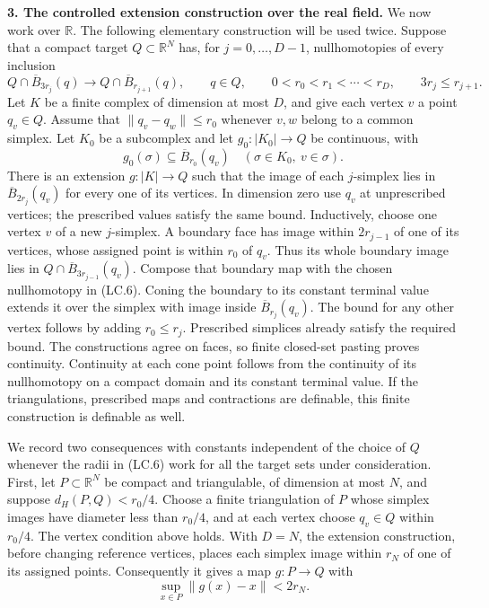 \textbf{3. The controlled extension construction over the real field.}
We now work over $\mathbb R$. The following elementary construction will
be used twice. Suppose that a compact target $Q\subset\mathbb R^N$
has, for $j=0,\ldots,D-1$, nullhomotopies of every inclusion
\[
 Q\cap\overline B_{3r_j}(q)
       \longrightarrow Q\cap\overline B_{r_{j+1}}(q),
 \qquad q\in Q,\qquad
 0<r_0<r_1<\cdots<r_D,\qquad 3r_j\le r_{j+1}.
 \tag{LC.6}
\]
Let $K$ be a finite complex of dimension at most $D$, and give each
vertex $v$ a point $q_v\in Q$. Assume that $\|q_v-q_w\|\le r_0$
whenever $v,w$ belong to a common simplex. Let $K_0$ be a subcomplex
and let $g_0:|K_0|\to Q$ be continuous, with
\[
 g_0(\sigma)\subseteq\overline B_{r_0}(q_v)
 \quad(\sigma\in K_0,\ v\in\sigma).
 \tag{LC.7}
\]
There is an extension $g:|K|\to Q$ such that the image of each
$j$-simplex lies in $\overline B_{2r_j}(q_v)$ for every one of its
vertices. In dimension zero use $q_v$ at unprescribed vertices; the
prescribed values satisfy the same bound. Inductively, choose one vertex
$v$ of a new $j$-simplex. A boundary face has image within $2r_{j-1}$
of one of its vertices, whose assigned point is within $r_0$ of $q_v$.
Thus its whole boundary image lies in
$Q\cap\overline B_{3r_{j-1}}(q_v)$. Compose that boundary map with
the chosen nullhomotopy in (LC.6). Coning the boundary to its constant
terminal value extends it over the simplex with image inside
$\overline B_{r_j}(q_v)$. The bound for any other vertex follows by
adding $r_0\le r_j$. Prescribed simplices already satisfy the required
bound. The constructions agree on faces, so finite closed-set pasting
proves continuity. Continuity at each cone point follows from the
continuity of its nullhomotopy on a compact domain and its constant
terminal value. If the triangulations, prescribed maps and contractions
are definable, this finite construction is definable as well.

We record two consequences with constants independent of the choice of
$Q$ whenever the radii in (LC.6) work for all the target sets under
consideration. First, let $P\subset\mathbb R^N$ be compact and
triangulable, of dimension at most $N$, and suppose
$d_H(P,Q)<r_0/4$. Choose a finite triangulation of $P$ whose simplex
images have diameter less than $r_0/4$, and at each vertex choose
$q_v\in Q$ within $r_0/4$. The vertex condition above holds. With
$D=N$, the extension construction, before changing reference vertices,
places each simplex image within $r_N$ of one of its assigned points.
Consequently it gives a map $g:P\to Q$ with
\[
             \sup_{x\in P}\|g(x)-x\|<2r_N.
 \tag{LC.8}
\]

